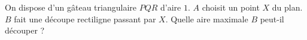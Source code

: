 On dispose d'un gâteau triangulaire $PQR$ d'aire $1$. $A$ choisit un point $X$ du plan. $B$ fait une découpe rectiligne passant par $X$. Quelle aire maximale $B$ peut-il découper ?

